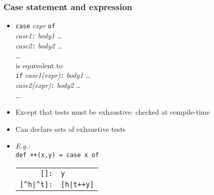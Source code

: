 \documentclass[12pt]{beamer}
\begin{document}
\begin{frame}[fragile]
\frametitle{Case statement and expression}
\begin{itemize}
\item \texttt{case} \emph{expr} \texttt{of} \\
\hspace*{1em} \emph{case1}\texttt{:} \emph{body1} \ldots \\
\hspace*{1em} \emph{case2}\texttt{:} \emph{body2} \ldots \\
\hspace*{1em} \ldots \\[2ex]
is equivalent to \\[2ex]
 \texttt{if} \emph{case1(expr)}\texttt{:} \emph{body1} \ldots \\
\hspace*{1em} \emph{case2(expr)}\texttt{:} \emph{body2} \ldots \\
\hspace*{1em} \ldots
\item Except that tests must be exhaustive: checked at compile-time
\item Can declare sets of exhaustive tests
\item \emph{E.g.:}\\
  \texttt{def ++(x,y) = case x of} \\
\hspace*{3em}
\begin{tabular}{rl}
\texttt{[]:} & \texttt{y}\\
\texttt{[\^{ }h|\^{ }t]:} & \texttt{[h|t++y]}\\
\end{tabular}
\end{itemize}
\end{frame}
\end{document}
